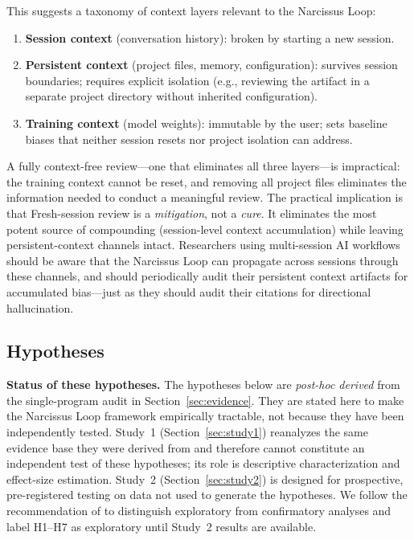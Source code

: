 \documentclass[12pt]{article}
\begin{document}
This suggests a taxonomy of context layers relevant to the Narcissus Loop:

\begin{enumerate}
    \item \textbf{Session context} (conversation history): broken by starting a new session.
    \item \textbf{Persistent context} (project files, memory, configuration): survives session boundaries; requires explicit isolation (e.g., reviewing the artifact in a separate project directory without inherited configuration).
    \item \textbf{Training context} (model weights): immutable by the user; sets baseline biases that neither session resets nor project isolation can address.
\end{enumerate}

A fully context-free review---one that eliminates all three layers---is impractical: the training context cannot be reset, and removing all project files eliminates the information needed to conduct a meaningful review. The practical implication is that Fresh-session review is a \emph{mitigation}, not a \emph{cure}. It eliminates the most potent source of compounding (session-level context accumulation) while leaving persistent-context channels intact. Researchers using multi-session AI workflows should be aware that the Narcissus Loop can propagate across sessions through these channels, and should periodically audit their persistent context artifacts for accumulated bias---just as they should audit their citations for directional hallucination.

\subsection{Hypotheses}
\label{sec:hypotheses}

\textbf{Status of these hypotheses.} The hypotheses below are \emph{post-hoc derived} from the single-program audit in Section~\ref{sec:evidence}. They are stated here to make the Narcissus Loop framework empirically tractable, not because they have been independently tested. Study~1 (Section~\ref{sec:study1}) reanalyzes the same evidence base they were derived from and therefore cannot constitute an independent test of these hypotheses; its role is descriptive characterization and effect-size estimation. Study~2 (Section~\ref{sec:study2}) is designed for prospective, pre-registered testing on data not used to generate the hypotheses. We follow the recommendation of \citet{kerr1998} to distinguish exploratory from confirmatory analyses and label H1--H7 as exploratory until Study~2 results are available.
\end{document}
